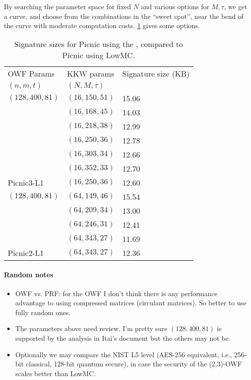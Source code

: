 By searching the parameter space for fixed $N$ and various options for $M,
\tau$, we get a curve, and choose from the combinations in the ``sweet spot'',
near the bend of the curve with moderate computation costs.  \cref{table:sig-sizes}
gives some options. 

\begin{table}
\begin{centering}
\begin{tabular}{l|l|l}
OWF Params      & KKW params        & Signature size (KB)\\
$(n,m,t)$       & $(N, M, \tau)$    &   \\\hline
$(128,400,81)$  & $(16, 150, 51)$   & 15.06 \\
                & $(16, 168, 45)$   & 14.03 \\ 
                & $(16, 218, 38)$   & 12.99 \\ 
                & $(16, 250, 36)$   & 12.78 \\
                & $(16, 303, 34)$   & 12.66 \\ 
                & $(16, 352, 33)$   & 12.70 \\
Picnic3-L1      & $(16, 250, 36)$   & 12.60 \\ \hline
$(128,400,81)$  & $(64, 149, 46)$   & 15.54 \\
                & $(64, 209, 34)$   & 13.00 \\ 
                & $(64, 246, 31)$   & 12.41 \\
                & $(64, 343, 27)$   & 11.69 \\
Picnic2-L1      & $(64, 343, 27)$   & 12.36 \\
\end{tabular}
\caption{ \label{table:sig-sizes}Signature sizes for Picnic using the \ttOWF, compared to Picnic using LowMC. }
\end{centering}
\end{table}


\paragraph{Random notes} 
\begin{itemize}
\item OWF vs. PRF: for the OWF I don't think there is any performance advantage to
using compressed matrices (circulant matrices). So better to use
fully random ones. 

\item The parameters above need review.  I'm pretty sure $(128, 400, 81)$ is supported
by the analysis in Itai's document but the others may not be. 

\item Optionally we may compare the NIST L5 level (AES-256 equivalent, i.e., 256-bit
classical, 128-bit quantum secure), in case the security of the (2,3)-OWF
scales better than LowMC. 
\end{itemize}


